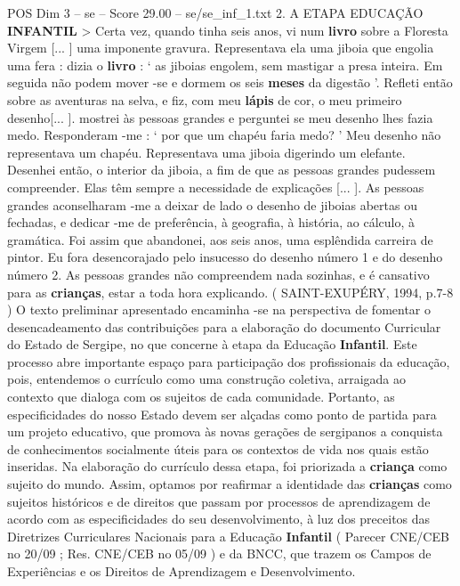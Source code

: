 \begin{textsample}{POS Dim 3 – se – Score 29.00 – se/se\_inf\_1.txt}  \label{ex:f3_pos_161}
2.
A ETAPA EDUCAÇÃO \textbf{INFANTIL} > Certa vez, quando tinha seis anos, vi num \textbf{livro} sobre a Floresta Virgem [... ] uma imponente gravura.
Representava ela uma jiboia que engolia uma fera : dizia o \textbf{livro} : ‘ as jiboias engolem, sem mastigar a presa inteira.
Em seguida não podem mover -se e dormem os seis \textbf{meses} da digestão ’.
Refleti então sobre as aventuras na selva, e fiz, com meu \textbf{lápis} de cor, o meu primeiro desenho[... ]. mostrei às pessoas grandes e perguntei se meu desenho lhes fazia medo.
Responderam -me : ‘ por que um chapéu faria medo? ’ Meu desenho não representava um chapéu.
Representava uma jiboia digerindo um elefante.
Desenhei então, o interior da jiboia, a fim de que as pessoas grandes pudessem compreender.
Elas têm sempre a necessidade de explicações [... ].
As pessoas grandes aconselharam -me a deixar de lado o desenho de jiboias abertas ou fechadas, e dedicar -me de preferência, à geografia, à história, ao cálculo, à gramática.
Foi assim que abandonei, aos seis anos, uma esplêndida carreira de pintor.
Eu fora desencorajado pelo insucesso do desenho número 1 e do desenho número 2.
As pessoas grandes não compreendem nada sozinhas, e é cansativo para as \textbf{crianças}, estar a toda hora explicando. ( SAINT-EXUPÉRY, 1994, p.7-8 ) O texto preliminar apresentado encaminha -se na perspectiva de fomentar o desencadeamento das contribuições para a elaboração do documento Curricular do Estado de Sergipe, no que concerne à etapa da Educação \textbf{Infantil}.
Este processo abre importante espaço para participação dos profissionais da educação, pois, entendemos o currículo como uma construção coletiva, arraigada ao contexto que dialoga com os sujeitos de cada comunidade.
Portanto, as especificidades do nosso Estado devem ser alçadas como ponto de partida para um projeto educativo, que promova às novas gerações de sergipanos a conquista de conhecimentos socialmente úteis para os contextos de vida nos quais estão inseridas.
Na elaboração do currículo dessa etapa, foi priorizada a \textbf{criança} como sujeito do mundo.
Assim, optamos por reafirmar a identidade das \textbf{crianças} como sujeitos históricos e de direitos que passam por processos de aprendizagem de acordo com as especificidades do seu desenvolvimento, à luz dos preceitos das Diretrizes Curriculares Nacionais para a Educação \textbf{Infantil} ( Parecer CNE/CEB no 20/09 ; Res.
CNE/CEB no 05/09 ) e da BNCC, que trazem os Campos de Experiências e os Direitos de Aprendizagem e Desenvolvimento.

\end{textsample}
